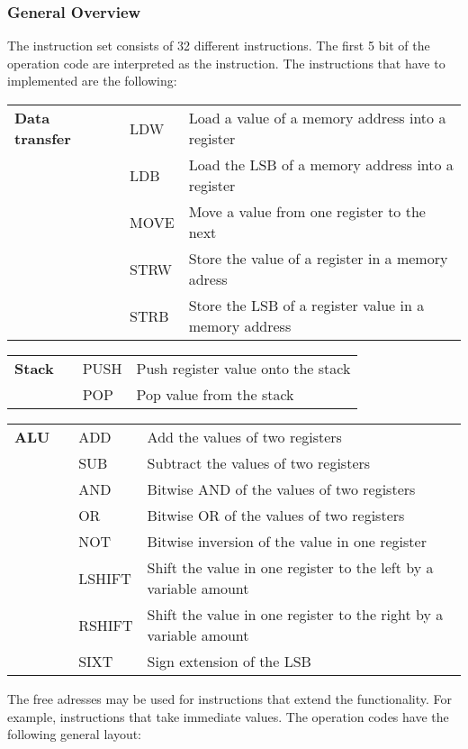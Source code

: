 \documentclass{report}
\newcounter{magicrownumbers}
\newcommand\rownumber{\stepcounter{magicrownumbers}\arabic{magicrownumbers}}
\begin{document}
\subsubsection*{General Overview}
The instruction set consists of 32 different instructions. The first 5 bit of the operation code are interpreted as the instruction. The instructions that have to implemented are the following:
\begin{table}[H]
	\centering
	\begin{longtable}{p{}p{}p{}p{}}
	\textbf{Data transfer}&\rownumber & LDW & Load a value of a memory address into a register\\
	&\rownumber & LDB & Load the LSB of a memory address into a register\\
	&\rownumber & MOVE & Move a value from one register to the next\\
	&\rownumber & STRW & Store the value of a register in a memory adress\\
	&\rownumber & STRB & Store the LSB of a register value in a memory address\\
	\end{longtable}
	\begin{longtable}{p{}p{}p{}p{}}
	\textbf{Stack}&\rownumber & PUSH & Push register value onto the stack\\
	&\rownumber & POP & Pop value from the stack\
	\end{longtable}
	\begin{longtable}{p{}p{}p{}p{}}
	\textbf{ALU}&\rownumber & ADD & Add the values of two registers\\
	&\rownumber & SUB & Subtract the values of two registers\\
	&\rownumber & AND & Bitwise AND of the values of two registers\\
	&\rownumber & OR & Bitwise OR of the values of two registers\\
	&\rownumber & NOT & Bitwise inversion of the value in one register\\
	&\rownumber & LSHIFT & Shift the value in one register to the left by a variable amount\\
	&\rownumber & RSHIFT & Shift the value in one register to the right by a variable amount\\
	&\rownumber & SIXT & Sign extension of the LSB\\
	\end{longtable}
\end{table}\noindent
The free adresses may be used for instructions that extend the functionality. For
example, instructions that take immediate values. The operation codes have the following
general layout:\par
\end{document}
